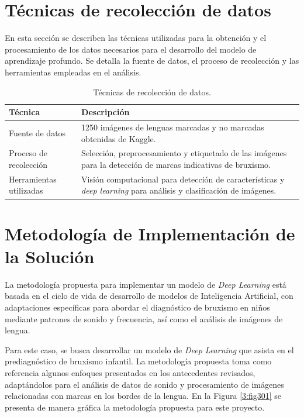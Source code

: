 \section{Técnicas de recolección de datos}
En esta sección se describen las técnicas utilizadas para la obtención y el procesamiento de los datos necesarios para el desarrollo del modelo de aprendizaje profundo. Se detalla la fuente de datos, el proceso de recolección y las herramientas empleadas en el análisis.

\begin{table}[H]
    \caption{Técnicas de recolección de datos.}
    \centering
    \renewcommand{\arraystretch}{1.5} %
    \setlength{\tabcolsep}{8pt} %
    \begin{tabular}{|p{4cm}|p{10cm}|}
        \hline
        \textbf{Técnica} & \textbf{Descripción} \\ \hline
        Fuente de datos & 1250 imágenes de lenguas marcadas y no marcadas obtenidas de Kaggle. \\ \hline
        Proceso de recolección & Selección, preprocesamiento y etiquetado de las imágenes para la detección de marcas indicativas de bruxismo. \\ \hline
        Herramientas utilizadas & Visión computacional para detección de características y \textit{deep learning} para análisis y clasificación de imágenes. \\ \hline
    \end{tabular}
\end{table}


\section{Metodología de Implementación de la Solución}

La metodología propuesta para implementar un modelo de \textit{Deep Learning} está basada en el ciclo de vida de desarrollo de modelos de Inteligencia Artificial, con adaptaciones específicas para abordar el diagnóstico de bruxismo en niños mediante patrones de sonido y frecuencia, así como el análisis de imágenes de lengua.

Para este caso, se busca desarrollar un modelo de \textit{Deep Learning} que asista en el prediagnóstico de bruxismo infantil. La metodología propuesta toma como referencia algunos enfoques presentados en los antecedentes revisados, adaptándolos para el análisis de datos de sonido y procesamiento de imágenes relacionadas con marcas en los bordes de la lengua. En la Figura \ref{3:fig301} se presenta de manera gráfica la metodología propuesta para este proyecto.

